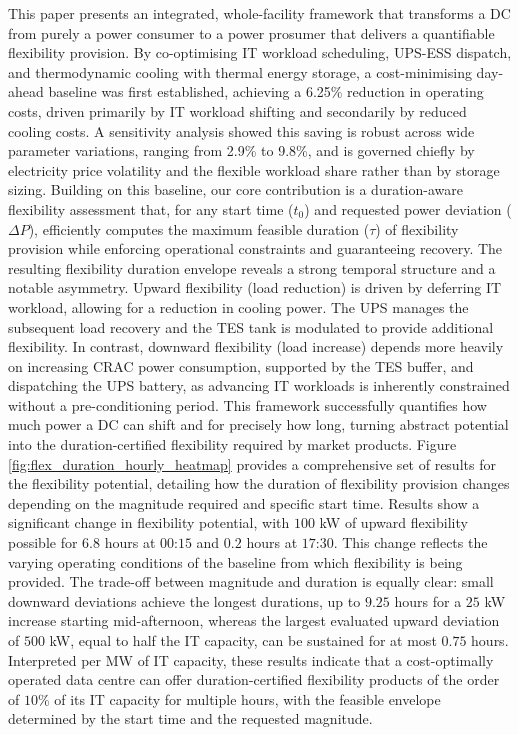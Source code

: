 \documentclass[lettersize,journal]{IEEEtran}
\newcommand{\rev}[1]{\textcolor{blue!70!black}{#1}}
\begin{document}
This paper presents an integrated, whole-facility framework that transforms a DC from purely a power consumer to a power prosumer that delivers a quantifiable flexibility provision. By co-optimising IT workload scheduling, UPS-ESS dispatch, and thermodynamic cooling with thermal energy storage, a cost-minimising day-ahead baseline was first established, achieving a \rev{6.25\% reduction in operating costs, driven primarily by IT workload shifting and secondarily by reduced cooling costs. A sensitivity analysis showed this saving is robust across wide parameter variations, ranging from 2.9\% to 9.8\%, and is governed chiefly by electricity price volatility and the flexible workload share rather than by storage sizing.} Building on this baseline, our core contribution is a duration-aware flexibility assessment that, for any start time ($t_0$) and requested power deviation ($\Delta P$), efficiently computes the maximum feasible duration ($\tau$) of flexibility provision while enforcing operational constraints and guaranteeing recovery. The resulting flexibility duration envelope reveals a strong temporal structure and a notable asymmetry. Upward flexibility (load reduction) is driven by deferring IT workload, allowing for a reduction in cooling power. The UPS manages the subsequent load recovery and the TES tank is modulated to provide additional flexibility. In contrast, downward flexibility (load increase) depends more heavily on increasing CRAC power consumption, supported by the TES buffer, and dispatching the UPS battery, as advancing IT workloads is inherently constrained without a pre-conditioning period. This framework successfully quantifies how much power a DC can shift and for precisely how long, turning abstract potential into the duration-certified flexibility required by market products. Figure \ref{fig:flex_duration_hourly_heatmap} provides a comprehensive set of results for the flexibility potential, detailing how the duration of flexibility provision changes depending on the magnitude required and specific start time. Results show a significant change in flexibility potential, with $100$ kW of upward flexibility possible for $6.8$ hours at $00$:$15$ and $0.2$ hours at $17$:$30$. This change reflects the varying operating conditions of the baseline from which flexibility is being provided. \rev{The trade-off between magnitude and duration is equally clear: small downward deviations achieve the longest durations, up to $9.25$ hours for a $25$ kW increase starting mid-afternoon, whereas the largest evaluated upward deviation of $500$ kW, equal to half the IT capacity, can be sustained for at most $0.75$ hours. Interpreted per MW of IT capacity, these results indicate that a cost-optimally operated data centre can offer duration-certified flexibility products of the order of $10\%$ of its IT capacity for multiple hours, with the feasible envelope determined by the start time and the requested magnitude.}
\end{document}
